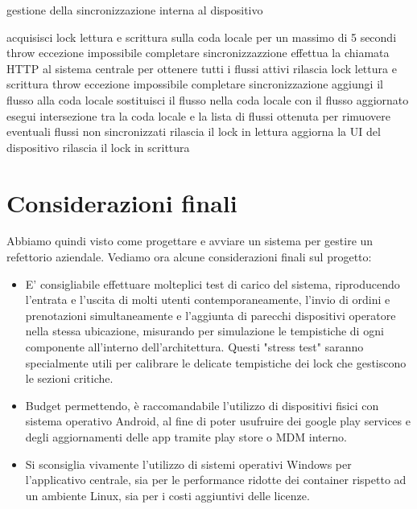 \documentclass[a4paper, titlepage, 12pt, openright, twoside]{book}
\begin{document}
\begin{algorithm}
\caption{gestione della sincronizzazione interna al dispositivo}
\begin{algorithmic}[1]
\State acquisisci lock lettura e scrittura sulla coda locale per un massimo di 5 secondi
\State throw eccezione impossibile completare sincronizzazzione
\EndIf
\State effettua la chiamata HTTP al sistema centrale per ottenere tutti i flussi attivi
	\State rilascia lock lettura e scrittura
	\State throw eccezione impossibile completare sincronizzazione
\EndIf
{}
		\State aggiungi il flusso alla coda locale
		\State sostituisci il flusso nella coda locale con il flusso aggiornato
	\EndIf
\EndFor
\State esegui intersezione tra la coda locale e la lista di flussi ottenuta per rimuovere eventuali flussi non sincronizzati
\State rilascia il lock in lettura
\State aggiorna la UI del dispositivo
\State rilascia il lock in scrittura
\end{algorithmic}
\end{algorithm}

\section{Considerazioni finali}

Abbiamo quindi visto come progettare e avviare un sistema per gestire un refettorio aziendale. Vediamo ora alcune considerazioni finali sul progetto:

\begin{itemize}
\item E' consigliabile effettuare molteplici test di carico del sistema, riproducendo l'entrata e l'uscita di molti utenti contemporaneamente, l'invio di ordini e prenotazioni simultaneamente e l'aggiunta di parecchi dispositivi operatore nella stessa ubicazione, misurando per simulazione le tempistiche di ogni componente all'interno dell'architettura. Questi "stress test" saranno specialmente utili per calibrare le delicate tempistiche dei lock che gestiscono le sezioni critiche.
\item Budget permettendo, è raccomandabile l'utilizzo di dispositivi fisici con sistema operativo Android, al fine di poter usufruire dei google play services e degli aggiornamenti delle app tramite play store o MDM interno.
\item Si sconsiglia vivamente l'utilizzo di sistemi operativi Windows per l'applicativo centrale, sia per le performance ridotte dei container rispetto ad un ambiente Linux, sia per i costi aggiuntivi delle licenze.
\end{itemize}
\end{document}
